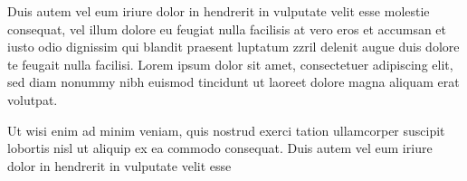 Duis autem vel eum iriure dolor in hendrerit in vulputate velit esse molestie consequat, vel illum dolore eu feugiat nulla facilisis at vero eros et accumsan et iusto odio dignissim qui blandit praesent luptatum zzril delenit augue duis dolore te feugait nulla facilisi. Lorem ipsum dolor sit amet, consectetuer adipiscing elit, sed diam nonummy nibh euismod tincidunt ut laoreet dolore magna aliquam erat volutpat.   

Ut wisi enim ad minim veniam, quis nostrud exerci tation ullamcorper suscipit lobortis nisl ut aliquip ex ea commodo consequat. Duis autem vel eum iriure dolor in hendrerit in vulputate velit esse


